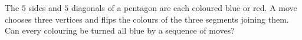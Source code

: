 The $5$ sides and $5$ diagonals of a pentagon are each coloured blue or red. A move chooses three vertices and flips the colours of the three segments joining them. Can every colouring be turned all blue by a sequence of moves?
